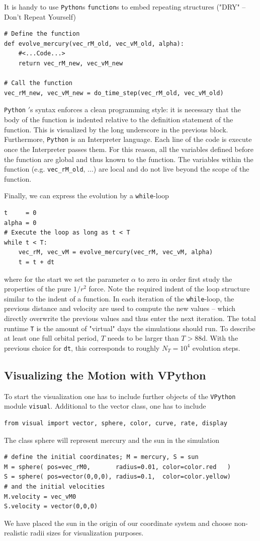 \documentclass[12pt]{iopart}
\newcommand{\python}[0]{\texttt{Python} }
\begin{document}
It is handy to use \texttt{Python}s \texttt{function}s to embed repeating structures ("DRY" -- Don't Repeat Yourself)
\begin{lstlisting}
# Define the function
def evolve_mercury(vec_rM_old, vec_vM_old, alpha):
	#<...Code...>
	return vec_rM_new, vec_vM_new

# Call the function
vec_rM_new, vec_vM_new = do_time_step(vec_rM_old, vec_vM_old)
\end{lstlisting}
\python{$\!'$}s syntax enforces a clean programming style: it is necessary that the body of the function is indented relative to the definition statement of the function.
This is visualized by the long underscore in the previous block.
Furthermore, \python is an Interpreter language.
Each line of the code is execute once the Interpreter passes them.
For this reason, all the variables defined before the function are global and thus known to the function.
The variables within the function (e.g. \texttt{vec\_rM\_old}, ...) are local and do not live beyond the scope of the function.

Finally, we can express the evolution by a \texttt{while}-loop
\begin{lstlisting}
t     = 0
alpha = 0
# Execute the loop as long as t < T
while t < T:
	vec_rM, vec_vM = evolve_mercury(vec_rM, vec_vM, alpha)
	t = t + dt
\end{lstlisting}
where for the start we set the parameter $\alpha$ to zero in order first study the properties of the pure 
$1/r^2$ force.
Note the required indent of the loop structure similar to the indent of a function.
In each iteration of the \texttt{while}-loop, the previous distance and velocity are used to compute the new values -- which directly overwrite the previous values and thus enter the next iteration.  The total runtime \texttt{T} is the amount of "virtual" days the simulations should run.
To describe at least one full orbital period, $T$ needs to be larger than $T>88$d.
With the previous choice for \texttt{dt}, this corresponds to roughly $N_T = 10^4$ evolution steps.


\subsection{Visualizing the Motion with VPython}
To start the visualization one has to include further objects of the \texttt{VPython} module \texttt{visual}.
Additional to the vector class, one has to include
\begin{lstlisting}
from visual import vector, sphere, color, curve, rate, display
\end{lstlisting}
The class sphere will represent mercury and the sun in the simulation
\begin{lstlisting}
# define the initial coordinates; M = mercury, S = sun
M = sphere( pos=vec_rM0,       radius=0.01, color=color.red   )
S = sphere( pos=vector(0,0,0), radius=0.1,  color=color.yellow)
# and the initial velocities
M.velocity = vec_vM0
S.velocity = vector(0,0,0)
\end{lstlisting}
We have placed the sun in the origin of our coordinate system and choose non-realistic radii sizes for visualization purposes.
\end{document}
